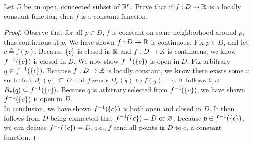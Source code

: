 \documentclass{report}
\begin{document}
\begin{question}{}{}
Let $D$ be an open, connected subset of $\mathbb{R}^n$. Prove that if  $f:D\rightarrow \mathbb{R}$ is a locally constant function, then $f$ is a constant function. 
\end{question}
\begin{proof}
Observe that for all $p \in D$, $f$ is constant on some neighborhood around  $p$, thus continuous at  $p$. We have shown $f:D\rightarrow \mathbb{R}$ is continuous. Fix $p \in D$, and let $c\triangleq f(p)$. Because $\{ c \}$ is closed in $\mathbb{R}$ and  $f:D\rightarrow \mathbb{R}$ is continuous, we know $f^{-1}(\{ c \})$ is closed in $D$. We now show $f^{-1}(\{ c \})$ is open in $D$. Fix arbitrary  $q \in f^{-1}(\{ c \})$. Because $f:D\rightarrow \mathbb{R}$ is locally constant, we know there exists  some  $r$ such that $B_r(q)\subseteq D$ and $f$ sends  $B_r(q)$ to $f(q)=c$. It follows that $B_r(q)\subseteq f^{-1}(\{ c \})$.   Because $q$ is arbitrary selected from $f^{-1}(\{ c \})$, we have shown $f^{-1}(\{ c \})$ is open in  $D$. \\

In conclusion, we have shown $f^{-1}(\{ c \})$ is both open and closed in $D$. It then follows from  $D$ being connected that  $f^{-1}(\{ c \})=D\text{ or }\varnothing$. Because $p \in f^{-1}(\{ c \})$, we can deduce $f^{-1}(\{ c \})=D$, i.e., $f$ send all points in  $D$ to  $c$, a constant function. 
\end{proof}
\end{document}

